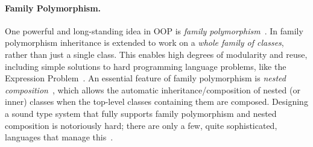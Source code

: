 \paragraph{Family Polymorphism.}
One powerful and long-standing idea in OOP is \emph{family
  polymorphism}~\cite{Ernst_2001}. In family polymorphism inheritance is
extended to work on a \emph{whole family of classes}, rather than just a single
class. This enables high degrees of modularity and
reuse, including simple solutions to hard programming language problems, like
the Expression Problem~\cite{wadler1998expression}. An essential feature of
family polymorphism is \emph{nested composition}~\cite{Corradi_2012,
  ErnstVirtual, Nystrom_2004}, which allows the automatic
inheritance/composition of nested (or inner) classes when the top-level classes
containing them are composed. Designing a sound type system that fully supports family
polymorphism and nested composition is notoriously hard; there are only
a few, quite sophisticated, languages that manage this~\cite{ErnstVirtual, Nystrom_2004, pubsdoc:tribe-virtual-calculus, SAITO_2007}.

